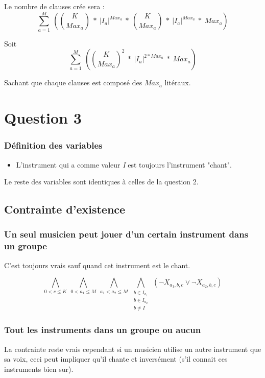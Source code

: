 \documentclass[11pt]{article}
\begin{document}
Le nombre de clauses crée sera : \\

$$\sum_{a=1}^{M}\ \left( {K \choose Max_a}\ * \ |I_a|^{Max_a}\ *\ {K \choose Max_a}\ *\ |I_a|^{Max_a}\ *\  Max_a \right) $$

Soit\\

$$\sum_{a=1}^{M}\ \left( {K \choose Max_a}^{2}\ * \ |I_a|^{2*Max_a}\ *\  Max_a \right) $$



Sachant que chaque clauses est composé des $Max_a$ litéraux.


\section{Question 3}

\subsubsection{Définition des variables}

\begin{itemize}
\item L'instrument qui a comme valeur \textit{I} est toujours l'instrument "chant".
\end{itemize}

Le reste des variables sont identiques à celles de la question 2.

\subsection{Contrainte d'existence}

\subsubsection{Un seul musicien peut jouer d'un certain instrument dans un groupe}

C'est toujours vrais sauf quand cet instrument est le chant.

$$\bigwedge\limits_{0<c\le K}\ \bigwedge\limits_{0<a_1\le M}\ \bigwedge\limits_{a_1<a_2\le M}\ \bigwedge\limits_{\substack{b\in I_{a_1} \\ b\in I_{a_2} \\ b \ne I}}\ \left(\neg X_{a_1,b,c} \vee \neg X_{a_2,b,c}\right)$$

\subsubsection{Tout les instruments dans un groupe ou aucun}
La contrainte reste vrais cependant si un musicien utilise un autre instrument que sa voix, ceci peut impliquer qu'il chante et inversément (s'il connait ces instruments bien sur).\\
\end{document}
